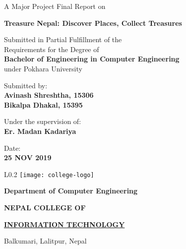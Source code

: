 \documentclass[12pt, a4paper]{report}
\begin{document}
\begin{titlepage}
	\begin{center}
	
	\large%
	A Major Project Final Report on
	
	\huge %
	\textbf{Treasure Nepal: Discover Places, Collect Treasures}

	\vfill
	
	\large %
	Submitted in Partial Fulfillment of the \\ 
	Requirements for the Degree of \\ 
	\textbf {Bachelor of Engineering in Computer Engineering} \\
	under Pokhara University
	
	\vfill
	
	Submitted by: \\ 
	\textbf {Avinash Shreshtha, 15306} \\
	\textbf {Bikalpa Dhakal, 15395} \\
	
	\vfill
	
	Under the supervision of: \\
	\textbf {Er. Madan Kadariya}
	
	\vfill
	
	Date: \\
	\textbf {25 NOV 2019}
	
	\vfill
	
	\end{center}
	
	\begin{wrapfigure}{L}{0.2\textwidth}
	\centering
	\texttt{[image: college-logo]}
	\end{wrapfigure}
	
	\selectfont
	
	\textbf {Department of Computer Engineering}  
	
	\Large %
	\textbf {NEPAL COLLEGE OF} 
	
	\LARGE %
	\textbf {\underline {INFORMATION TECHNOLOGY} }
	
	\small %
	Balkumari, Lalitpur, Nepal
	
	
\end{titlepage}
\end{document}

